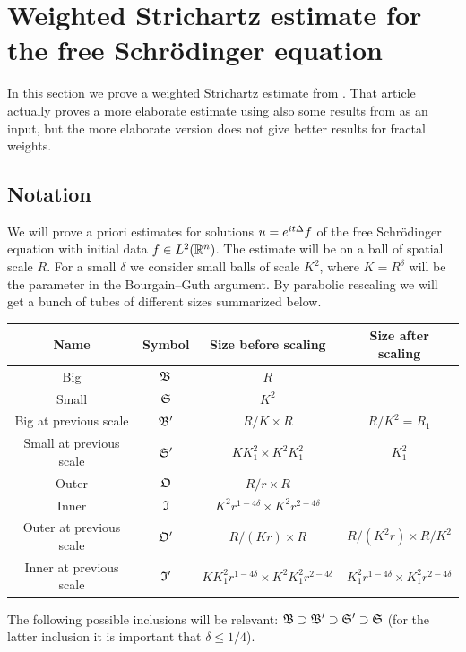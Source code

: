 \section{Weighted Strichartz estimate for the free Schr\"odinger equation}

In this section we prove a weighted Strichartz estimate from \cite{arxiv:1805.02775}.
That article actually proves a more elaborate estimate using also some results from \cite{MR3842310} as an input, but the more elaborate version does not give better results for fractal weights.

\subsection{Notation}
We will prove a priori estimates for solutions $u = e^{i t \Delta} f$ of the free Schr\"odinger equation with initial data $f \in L^{2}(\mathbb{R}^{n})$.
The estimate will be on a ball of spatial scale $R$.
For a small $\delta$ we consider small balls of scale $K^{2}$, where $K=R^{\delta}$ will be the parameter in the Bourgain--Guth argument.
By parabolic rescaling we will get a bunch of tubes of different sizes summarized below.
\begin{center}
\begin{tabular}{cccc} \toprule
  Name & Symbol & Size before scaling & Size after scaling\\ \midrule
  Big & $\mathfrak{B}$ & $R$ & \\
  Small & $\mathfrak{S}$ & $K^{2}$ & \\
  Big at previous scale & $\mathfrak{B}'$ & $R/K \times R$ & $R/K^{2} = R_{1}$\\
  Small at previous scale & $\mathfrak{S}'$ & $KK_{1}^{2} \times K^{2}K_{1}^{2}$ & $K_{1}^{2}$\\ \midrule
  Outer & $\mathfrak{O}$ & $R/r \times R$ & \\
  Inner & $\mathfrak{I}$ & $K^{2} r^{1-4\delta} \times K^{2} r^{2-4\delta}$ & \\
  Outer at previous scale& $\mathfrak{O}'$ & $R/(Kr) \times R$ & $R/(K^{2}r) \times R/K^{2}$\\
  Inner at previous scale & $\mathfrak{I}'$ & $K K_{1}^{2} r^{1-4\delta} \times K^{2} K_{1}^{2} r^{2-4\delta}$ & $K_{1}^{2} r^{1-4\delta} \times K_{1}^{2} r^{2-4\delta}$\\
  \bottomrule
\end{tabular}
\end{center}
The following possible inclusions will be relevant: $\mathfrak{B} \supset \mathfrak{B}' \supset \mathfrak{S}' \supset \mathfrak{S}$ (for the latter inclusion it is important that $\delta \leq 1/4$).


